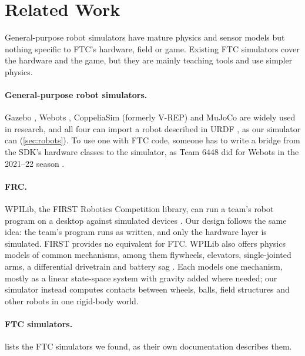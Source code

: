 \documentclass[10pt,twocolumn,letterpaper]{article}
\begin{document}
\section{Related Work}\label{sec:related}

General-purpose robot simulators have mature physics and sensor models but nothing specific to FTC's hardware, field or game. Existing FTC simulators cover the hardware and the game, but they are mainly teaching tools and use simpler physics.

\paragraph{General-purpose robot simulators.} Gazebo \citep{koenig2004gazebo}, Webots \citep{michel2004webots}, CoppeliaSim (formerly V-REP) \citep{rohmer2013vrep} and MuJoCo \citep{todorov2012mujoco} are widely used in research, and all four can import a robot described in URDF \citep{openrobotics2026urdf}, as our simulator can (\cref{sec:robots}). To use one with FTC code, someone has to write a bridge from the SDK's hardware classes to the simulator, as Team 6448 did for Webots in the 2021–22 season \citep{team6448ftcsimulator}.

\paragraph{FRC.} WPILib, the FIRST Robotics Competition library, can run a team's robot program on a desktop against simulated devices \citep{wpilib2026simulation}. Our design follows the same idea: the team's program runs as written, and only the hardware layer is simulated. FIRST provides no equivalent for FTC. WPILib also offers physics models of common mechanisms, among them flywheels, elevators, single-jointed arms, a differential drivetrain and battery sag \citep{wpilib2026physics}. Each models one mechanism, mostly as a linear state-space system with gravity added where needed; our simulator instead computes contacts between wheels, balls, field structures and other robots in one rigid-body world.

\paragraph{FTC simulators.}  lists the FTC simulators we found, as their own documentation describes them.
\end{document}

